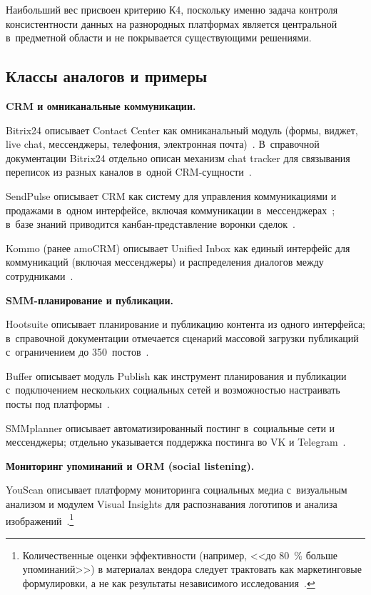 Наибольший вес присвоен критерию К4, поскольку именно задача контроля консистентности данных на разнородных платформах является центральной в~предметной области и не покрывается существующими решениями.

\subsection{Классы аналогов и примеры}
\label{subsec:analogue-classes}

\textbf{CRM и омниканальные коммуникации.}

Bitrix24 описывает Contact Center как омниканальный модуль (формы, виджет, live chat, мессенджеры, телефония, электронная почта)~\cite{src:24, src:25}. В~справочной документации Bitrix24 отдельно описан механизм chat tracker для связывания переписок из разных каналов в~одной CRM-сущности~\cite{src:13}.

SendPulse описывает CRM как систему для управления коммуникациями и продажами в~одном интерфейсе, включая коммуникации в~мессенджерах~\cite{src:14}; в~базе знаний приводится канбан-представление воронки сделок~\cite{src:11}.

Kommo (ранее amoCRM) описывает Unified Inbox как единый интерфейс для коммуникаций (включая мессенджеры) и распределения диалогов между сотрудниками~\cite{src:34}.

\textbf{SMM-планирование и публикации.}

Hootsuite описывает планирование и публикацию контента из одного интерфейса; в~справочной документации отмечается сценарий массовой загрузки публикаций с~ограничением до 350~постов~\cite{src:26, src:27}.

Buffer описывает модуль Publish как инструмент планирования и публикации с~подключением нескольких социальных сетей и возможностью настраивать посты под платформы~\cite{src:28, src:29}.

SMMplanner описывает автоматизированный постинг в~социальные сети и мессенджеры; отдельно указывается поддержка постинга во VK и Telegram~\cite{src:30, src:31}.

\textbf{Мониторинг упоминаний и ORM (social listening).}

YouScan описывает платформу мониторинга социальных медиа с~визуальным анализом и модулем Visual Insights для распознавания логотипов и анализа изображений~\cite{src:32, src:33}.\footnote{Количественные оценки эффективности (например, <<до 80~\% больше упоминаний>>) в материалах вендора следует трактовать как маркетинговые формулировки, а не как результаты независимого исследования~\cite{src:33}.}

